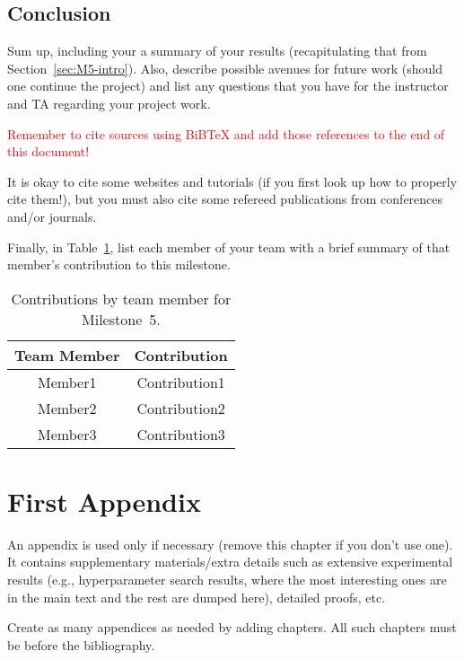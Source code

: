 \documentclass{report}
\begin{document}
\section{Conclusion}

Sum up, including your a summary of your results  (recapitulating that from Section~\ref{sec:M5-intro}).  Also, describe possible avenues for future work (should one continue the project) and list any questions that you have for the instructor and TA regarding your project work.

\textcolor{red}{Remember to cite sources using BiBTeX and add those references to the end of this document!}

It is okay to cite some websites and tutorials (if you first look up how to properly cite them!), but you must also cite some refereed publications from conferences and/or journals.

Finally, in Table~\ref{tab:contribution5}, list each member of your team with a brief summary of that member's contribution to this milestone.

\begin{table}[]
    \caption{Contributions by team member for Milestone~5.}
    \centering
    \begin{tabular}{|c|c|} \hline
    {\bf Team Member}     &  {\bf Contribution}  \\ \hline
    Member1     &  Contribution1 \\
    Member2     &  Contribution2 \\
    Member3     &  Contribution3 \\ \hline
    \end{tabular}
    \label{tab:contribution5}
\end{table}



\appendix

\chapter{First Appendix}

An appendix is used only if necessary (remove this chapter if you don't use one). It contains supplementary materials/extra details such as extensive experimental results (e.g., hyperparameter search results, where the most interesting ones are in the main text and the rest are dumped here), detailed proofs, etc. 

Create as many appendices as needed by adding chapters. All such chapters must be before the bibliography. 




\end{document}
